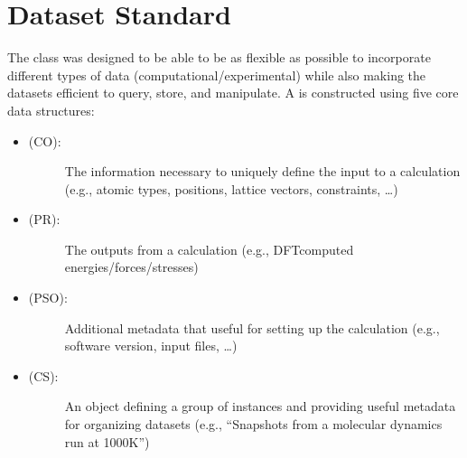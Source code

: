 \documentclass[letterpaper,10pt,english]{sphinxmanual}
\begin{document}
\section{Dataset Standard}
\label{\detokenize{overview:dataset-standard}}
\sphinxAtStartPar
The {\hyperref[\detokenize{dataset:colabfit.tools.dataset.Dataset}]{}} class was designed to be able to
be as flexible as possible to incorporate different types of data
(computational/experimental) while also making the datasets efficient to query,
store, and manipulate. A {\hyperref[\detokenize{dataset:colabfit.tools.dataset.Dataset}]{}} is constructed using five core data
structures:
\begin{itemize}
\item {} \begin{description}
\item[{{\hyperref[\detokenize{configuration:colabfit.tools.configuration.Configuration}]{}} (CO):}] \leavevmode
\sphinxAtStartPar
The information necessary to uniquely define the input to a calculation
(e.g., atomic types, positions, lattice vectors, constraints, …)

\end{description}

\item {} \begin{description}
\item[{{\hyperref[\detokenize{property:colabfit.tools.property.Property}]{}} (PR):}] \leavevmode
\sphinxAtStartPar
The outputs from a calculation (e.g., DFT\sphinxhyphen{}computed
energies/forces/stresses)

\end{description}

\item {} \begin{description}
\item[{{\hyperref[\detokenize{property_settings:colabfit.tools.property_settings.PropertySettings}]{}} (PSO):}] \leavevmode
\sphinxAtStartPar
Additional metadata that useful for setting up the calculation (e.g.,
software version, input files, …)

\end{description}

\item {} \begin{description}
\item[{{\hyperref[\detokenize{configuration_set:colabfit.tools.configuration_sets.ConfigurationSet}]{}} (CS):}] \leavevmode
\sphinxAtStartPar
An object defining a group of
{\hyperref[\detokenize{configuration:colabfit.tools.configuration.Configuration}]{}} instances and
providing useful metadata for organizing datasets (e.g., “Snapshots from a
molecular dynamics run at 1000K”)


\end{description}
\end{itemize}
\end{document}
